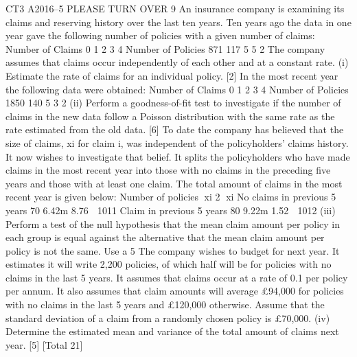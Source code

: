 \documentclass[a4paper,12pt]{article}
\begin{document}
\begin{enumerate}

CT3 A2016–5 PLEASE TURN OVER
9 An insurance company is examining its claims and reserving history over the last ten
years.
Ten years ago the data in one year gave the following number of policies with a given
number of claims:
  Number of Claims 0 1 2 3 4
Number of Policies 871 117 5 5 2
The company assumes that claims occur independently of each other and at a constant
rate.
(i) Estimate the rate of claims for an individual policy. [2]
In the most recent year the following data were obtained:
  Number of Claims 0 1 2 3 4
Number of Policies 1850 140 5 3 2
(ii) Perform a goodness-of-fit test to investigate if the number of claims in the new
data follow a Poisson distribution with the same rate as the rate estimated from
the old data. [6]
To date the company has believed that the size of claims, xi for claim i, was
independent of the policyholders’ claims history. It now wishes to investigate that
belief. It splits the policyholders who have made claims in the most recent year into
those with no claims in the preceding five years and those with at least one claim.
The total amount of claims in the most recent year is given below:
  Number of policies xi 2
xi
No claims in previous 5 years 70 6.42m 8.76  1011
Claim in previous 5 years 80 9.22m 1.52  1012
(iii) Perform a test of the null hypothesis that the mean claim amount per policy in
each group is equal against the alternative that the mean claim amount per
policy is not the same. Use a 5%
The company wishes to budget for next year. It estimates it will write 2,200 policies,
of which half will be for policies with no claims in the last 5 years. It assumes that
claims occur at a rate of 0.1 per policy per annum. It also assumes that claim amounts
will average £94,000 for policies with no claims in the last 5 years and £120,000
otherwise. Assume that the standard deviation of a claim from a randomly chosen
policy is £70,000.
(iv) Determine the estimated mean and variance of the total amount of claims next
year. [5]
[Total 21]



\end{enumerate}
\end{document}
